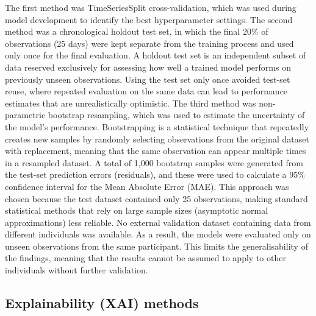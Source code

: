 \documentclass[fleqn,10pt]{wlscirep}
\begin{document}
The first method was TimeSeriesSplit cross-validation, which was used during model development to identify the best hyperparameter settings. The second method was a chronological holdout test set, in which the final 20\% of observations (25 days) were kept separate from the training process and used only once for the final evaluation. A holdout test set is an independent subset of data reserved exclusively for assessing how well a trained model performs on previously unseen observations. Using the test set only once avoided test-set reuse, where repeated evaluation on the same data can lead to performance estimates that are unrealistically optimistic. The third method was non-parametric bootstrap resampling, which was used to estimate the uncertainty of the model's performance. Bootstrapping is a statistical technique that repeatedly creates new samples by randomly selecting observations from the original dataset with replacement, meaning that the same observation can appear multiple times in a resampled dataset. A total of 1,000 bootstrap samples were generated from the test-set prediction errors (residuals), and these were used to calculate a 95\% confidence interval for the Mean Absolute Error (MAE). This approach was chosen because the test dataset contained only 25 observations, making standard statistical methods that rely on large sample sizes (asymptotic normal approximations) less reliable. No external validation dataset containing data from different individuals was available. As a result, the models were evaluated only on unseen observations from the same participant. This limits the generalisability of the findings, meaning that the results cannot be assumed to apply to other individuals without further validation.

\subsection*{Explainability (XAI) methods}
\end{document}
